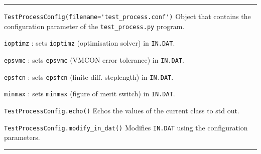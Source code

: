 \documentclass[11pt,a4paper]{report}
\newcommand{\indat}{\mbox{\texttt{IN.DAT}}}
\begin{document}
\rule{\textwidth}{0.4pt}

\begin{description}

\item{\verb|TestProcessConfig(filename='test_process.conf')|} Object that
  contains the configuration parameter of the \verb|test_process.py| program.

  \verb|ioptimz| : sets \verb|ioptimz| (optimisation solver) in \indat.

  \verb|epsvmc| : sets \verb|epsvmc| (VMCON error tolerance) in \indat.

  \verb|epsfcn| : sets \verb|epsfcn| (finite diff. steplength) in \indat.

  \verb|minmax| : sets \verb|minmax| (figure of merit switch) in \indat.

\item{\verb|TestProcessConfig.echo()|} Echos the values of the current class
  to std out.

\item{\verb|TestProcessConfig.modify_in_dat()|} Modifies \indat\/ using the
  configuration parameters.

\end{description}

\rule{\textwidth}{0.4pt}
\end{document}
